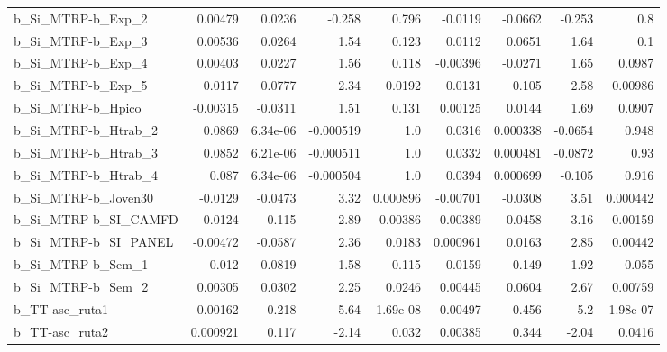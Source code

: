 \begin{tabular}{lrrrrrrrr}
b\_Si\_MTRP-b\_Exp\_2          &     0.00479 &       0.0236 &    -0.258 &    0.796 &    -0.0119 &     -0.0662 &       -0.253 &           0.8 \\
b\_Si\_MTRP-b\_Exp\_3          &     0.00536 &       0.0264 &      1.54 &    0.123 &     0.0112 &      0.0651 &         1.64 &           0.1 \\
b\_Si\_MTRP-b\_Exp\_4          &     0.00403 &       0.0227 &      1.56 &    0.118 &   -0.00396 &     -0.0271 &         1.65 &        0.0987 \\
b\_Si\_MTRP-b\_Exp\_5          &      0.0117 &       0.0777 &      2.34 &   0.0192 &     0.0131 &       0.105 &         2.58 &       0.00986 \\
b\_Si\_MTRP-b\_Hpico          &    -0.00315 &      -0.0311 &      1.51 &    0.131 &    0.00125 &      0.0144 &         1.69 &        0.0907 \\
b\_Si\_MTRP-b\_Htrab\_2        &      0.0869 &     6.34e-06 & -0.000519 &      1.0 &     0.0316 &    0.000338 &      -0.0654 &         0.948 \\
b\_Si\_MTRP-b\_Htrab\_3        &      0.0852 &     6.21e-06 & -0.000511 &      1.0 &     0.0332 &    0.000481 &      -0.0872 &          0.93 \\
b\_Si\_MTRP-b\_Htrab\_4        &       0.087 &     6.34e-06 & -0.000504 &      1.0 &     0.0394 &    0.000699 &       -0.105 &         0.916 \\
b\_Si\_MTRP-b\_Joven30        &     -0.0129 &      -0.0473 &      3.32 & 0.000896 &   -0.00701 &     -0.0308 &         3.51 &      0.000442 \\
b\_Si\_MTRP-b\_SI\_CAMFD       &      0.0124 &        0.115 &      2.89 &  0.00386 &    0.00389 &      0.0458 &         3.16 &       0.00159 \\
b\_Si\_MTRP-b\_SI\_PANEL       &    -0.00472 &      -0.0587 &      2.36 &   0.0183 &   0.000961 &      0.0163 &         2.85 &       0.00442 \\
b\_Si\_MTRP-b\_Sem\_1          &       0.012 &       0.0819 &      1.58 &    0.115 &     0.0159 &       0.149 &         1.92 &         0.055 \\
b\_Si\_MTRP-b\_Sem\_2          &     0.00305 &       0.0302 &      2.25 &   0.0246 &    0.00445 &      0.0604 &         2.67 &       0.00759 \\
b\_TT-asc\_ruta1             &     0.00162 &        0.218 &     -5.64 & 1.69e-08 &    0.00497 &       0.456 &         -5.2 &      1.98e-07 \\
b\_TT-asc\_ruta2             &    0.000921 &        0.117 &     -2.14 &    0.032 &    0.00385 &       0.344 &        -2.04 &        0.0416 \\

\end{tabular}
